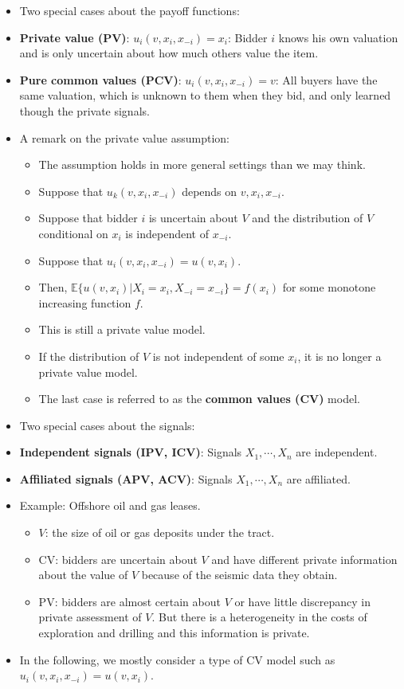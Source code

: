 \documentclass[
]{book}
\providecommand{\tightlist}{%
  \setlength{\itemsep}{0pt}\setlength{\parskip}{0pt}}
\begin{document}
\begin{itemize}
\tightlist
\item
  Two special cases about the payoff functions:
\item
  \textbf{Private value (PV)}: \(u_i(v, x_i, x_{-i}) = x_i\): Bidder \(i\) knows his own valuation and is only uncertain about how much others value the item.
\item
  \textbf{Pure common values (PCV)}: \(u_i(v, x_i, x_{-i}) = v\): All buyers have the same valuation, which is unknown to them when they bid, and only learned though the private signals.
\item
  A remark on the private value assumption:

  \begin{itemize}
  \tightlist
  \item
    The assumption holds in more general settings than we may think.
  \item
    Suppose that \(u_k(v, x_i, x_{-i})\) depends on \(v, x_i, x_{-i}\).
  \item
    Suppose that bidder \(i\) is uncertain about \(V\) and the distribution of \(V\) conditional on \(x_i\) is independent of \(x_{-i}\).
  \item
    Suppose that \(u_i(v, x_i, x_{-i}) = u(v, x_i)\).
  \item
    Then, \(\mathbb{E}\{u(v, x_i)|X_i = x_i, X_{-i} = x_{-i}\} = f(x_i)\) for some monotone increasing function \(f\).
  \item
    This is still a private value model.
  \item
    If the distribution of \(V\) is not independent of some \(x_i\), it is no longer a private value model.
  \item
    The last case is referred to as the \textbf{common values (CV)} model.
  \end{itemize}
\item
  Two special cases about the signals:
\item
  \textbf{Independent signals (IPV, ICV)}: Signals \(X_1, \cdots, X_n\) are independent.
\item
  \textbf{Affiliated signals (APV, ACV)}: Signals \(X_1, \cdots, X_n\) are affiliated.
\item
  Example: Offshore oil and gas leases.

  \begin{itemize}
  \tightlist
  \item
    \(V\): the size of oil or gas deposits under the tract.
  \item
    CV: bidders are uncertain about \(V\) and have different private information about the value of \(V\) because of the seismic data they obtain.
  \item
    PV: bidders are almost certain about \(V\) or have little discrepancy in private assessment of \(V\). But there is a heterogeneity in the costs of exploration and drilling and this information is private.
  \end{itemize}
\item
  In the following, we mostly consider a type of CV model such as \(u_i(v, x_i, x_{-i}) = u(v, x_i)\).
\end{itemize}
\end{document}
